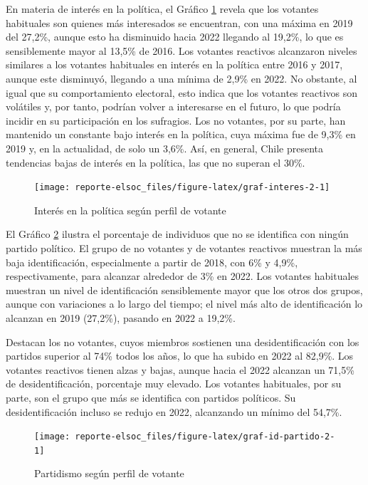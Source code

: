 \documentclass[
  12pt,
]{book}
\begin{document}
En materia de interés en la política, el Gráfico \ref{fig:graf-interes-2} revela que los votantes habituales son quienes más interesados se encuentran, con una máxima en 2019 del 27,2\%, aunque esto ha disminuido hacia 2022 llegando al 19,2\%, lo que es sensiblemente mayor al 13,5\% de 2016. Los votantes reactivos alcanzaron niveles similares a los votantes habituales en interés en la política entre 2016 y 2017, aunque este disminuyó, llegando a una mínima de 2,9\% en 2022. No obstante, al igual que su comportamiento electoral, esto indica que los votantes reactivos son volátiles y, por tanto, podrían volver a interesarse en el futuro, lo que podría incidir en su participación en los sufragios. Los no votantes, por su parte, han mantenido un constante bajo interés en la política, cuya máxima fue de 9,3\% en 2019 y, en la actualidad, de solo un 3,6\%. Así, en general, Chile presenta tendencias bajas de interés en la política, las que no superan el 30\%.

\begin{figure}

{\centering \texttt{[image: reporte-elsoc\_files/figure-latex/graf-interes-2-1]} 

}

\caption{Interés en la política según perfil de votante}\label{fig:graf-interes-2}
\end{figure}

El Gráfico \ref{fig:graf-id-partido-2} ilustra el porcentaje de individuos que no se identifica con ningún partido político. El grupo de no votantes y de votantes reactivos muestran la más baja identificación, especialmente a partir de 2018, con 6\% y 4,9\%, respectivamente, para alcanzar alrededor de 3\% en 2022. Los votantes habituales muestran un nivel de identificación sensiblemente mayor que los otros dos grupos, aunque con variaciones a lo largo del tiempo; el nivel más alto de identificación lo alcanzan en 2019 (27,2\%), pasando en 2022 a 19,2\%.

Destacan los no votantes, cuyos miembros sostienen una desidentificación con los partidos superior al 74\% todos los años, lo que ha subido en 2022 al 82,9\%. Los votantes reactivos tienen alzas y bajas, aunque hacia el 2022 alcanzan un 71,5\% de desidentificación, porcentaje muy elevado. Los votantes habituales, por su parte, son el grupo que más se identifica con partidos políticos. Su desidentificación incluso se redujo en 2022, alcanzando un mínimo del 54,7\%.

\begin{figure}

{\centering \texttt{[image: reporte-elsoc\_files/figure-latex/graf-id-partido-2-1]} 

}

\caption{Partidismo según perfil de votante}\label{fig:graf-id-partido-2}
\end{figure}
\end{document}

